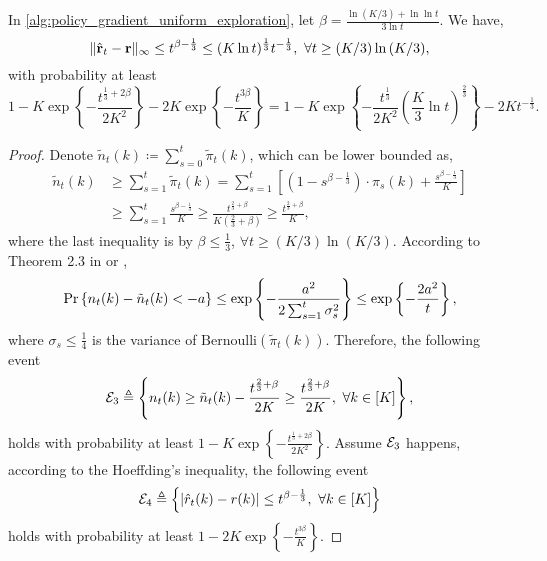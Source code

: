 \begin{thm}
\label{thm:reward_estimation_hoeffding}
    In \cref{alg:policy_gradient_uniform_exploration}, let $\beta = \frac{ \ln{(K/3) + \ln{\ln{t}} } }{ 3 \ln{t}}$. We have,
\begin{equation*}
    \| \hat{{\mathbf{r}}}_t - {\mathbf{r}} \|_\infty \le t^{\beta - \frac{1}{3}} \le ( K \ln{t} )^\frac{1}{3} t^{- \frac{1}{3}}, \ \forall t \ge (K/3) \ln{(K/3) },
\end{equation*}
with probability at least
\begin{equation*}
    1 - K \exp\left\{ - \frac{t^{\frac{1}{3} + 2 \beta}}{2 K^2} \right\} - 2 K \exp\left\{ - \frac{t^{3\beta}}{ K } \right\} = 1 - K \exp\left\{ - \frac{t^{\frac{1}{3}}}{2 K^2} \left( \frac{K}{3} \ln{t} \right)^{\frac{2}{3}} \right\} - 2 K t^{- \frac{1}{3}}.
\end{equation*}
\end{thm}
\begin{proof}
    Denote $\tilde{n}_t(k) \coloneqq \sum\limits_{s=0}^{t}{ \tilde{\pi}_t(k)}$, which can be lower bounded as,
\begin{equation*}
\begin{split}
    \tilde{n}_t(k) &\ge \sum\limits_{s=1}^{t}{ \tilde{\pi}_t(k)} = \sum\limits_{s=1}^{t}{ \left[ \left( 1 - s^{\beta - \frac{1}{3}} \right) \cdot \pi_{s}(k) + \frac{s^{\beta - \frac{1}{3}}}{K} \right] } \\
    &\ge \sum\limits_{s=1}^{t}{ \frac{s^{\beta - \frac{1}{3}}}{K} } \ge \frac{t^{\frac{2}{3} + \beta}}{ K  \left(\frac{2}{3} + \beta \right) } \ge \frac{t^{\frac{2}{3} + \beta}}{ K },
\end{split}
\end{equation*}
where the last inequality is by $\beta \le \frac{1}{3}$, $\forall t \ge (K/3) \ln{(K/3) }$. According to Theorem 2.3 in \citet{wainwright2015mathematical} or \citet{wainwright2019high},
\begin{equation*}
\begin{split}
    \operatorname*{Pr}\left\{ n_t(k) - \tilde{n}_t(k) < - a \right\} \le \exp\left\{ - \frac{a^2}{2 \sum_{s=1}^{t}{\sigma_s^2} } \right\} \le \exp\left\{ - \frac{2 a^2}{ t } \right\},
\end{split}
\end{equation*}
where $\sigma_s \le \frac{1}{4}$ is the variance of $\text{Bernoulli}( \tilde{\pi}_t(k))$. Therefore, the following event
\begin{equation*}
    {\mathcal{E}}_3 \triangleq \left\{ n_t(k) \ge \tilde{n}_t(k) - \frac{t^{\frac{2}{3} + \beta}}{ 2 K } \ge \frac{t^{\frac{2}{3} + \beta}}{ 2 K}, \ \forall k \in [K] \right\},
\end{equation*}
holds with probability at least $1 - K \exp\left\{ -  \frac{t^{\frac{1}{3} + 2 \beta}}{2 K^2} \right\}$. Assume ${\mathcal{E}}_3$ happens, according to the Hoeffding's inequality, the following event
\begin{equation*}
    {\mathcal{E}}_4 \triangleq \left\{ | \hat{r}_{t}(k) - r(k) | \le t^{\beta - \frac{1}{3}} , \ \forall k \in [K] \right\}
\end{equation*}
holds with probability at least $1 - 2 K \exp\left\{ - \frac{t^{3\beta}}{ K } \right\}$.
\end{proof}

